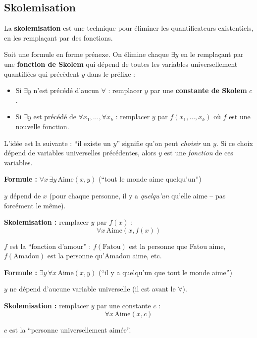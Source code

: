 \documentclass[11pt,a4paper]{article}
\begin{document}
\subsection{Skolemisation}

La \textbf{skolemisation} est une technique pour éliminer les quantificateurs existentiels, en les remplaçant par des fonctions.

\begin{definitionbox}
Soit une formule en forme prénexe. On élimine chaque $\exists y$ en le remplaçant par une \textbf{fonction de Skolem} qui dépend de toutes les variables universellement quantifiées qui précèdent $y$ dans le préfixe :
\begin{itemize}[nosep]
    \item Si $\exists y$ n'est précédé d'aucun $\forall$ : remplacer $y$ par une \textbf{constante de Skolem} $c$.
    \item Si $\exists y$ est précédé de $\forall x_1, \ldots, \forall x_k$ : remplacer $y$ par $f(x_1, \ldots, x_k)$ où $f$ est une nouvelle fonction.
\end{itemize}
\end{definitionbox}

L'idée est la suivante : ``il existe un $y$'' signifie qu'on peut \textit{choisir} un $y$. Si ce choix dépend de variables universelles précédentes, alors $y$ est une \textit{fonction} de ces variables.

\begin{exemplebox}
\textbf{Formule :} $\forall x \, \exists y \, \text{Aime}(x, y)$ \quad (``tout le monde aime quelqu'un'')

$y$ dépend de $x$ (pour chaque personne, il y a \textit{quelqu'un} qu'elle aime -- pas forcément le même).

\textbf{Skolemisation :} remplacer $y$ par $f(x)$ :
$$\forall x \, \text{Aime}(x, f(x))$$

$f$ est la ``fonction d'amour'' : $f(\text{Fatou})$ est la personne que Fatou aime, $f(\text{Amadou})$ est la personne qu'Amadou aime, etc.

\medskip

\textbf{Formule :} $\exists y \, \forall x \, \text{Aime}(x, y)$ \quad (``il y a quelqu'un que tout le monde aime'')

$y$ ne dépend d'aucune variable universelle (il est avant le $\forall$).

\textbf{Skolemisation :} remplacer $y$ par une constante $c$ :
$$\forall x \, \text{Aime}(x, c)$$

$c$ est la ``personne universellement aimée''.
\end{exemplebox}
\end{document}
